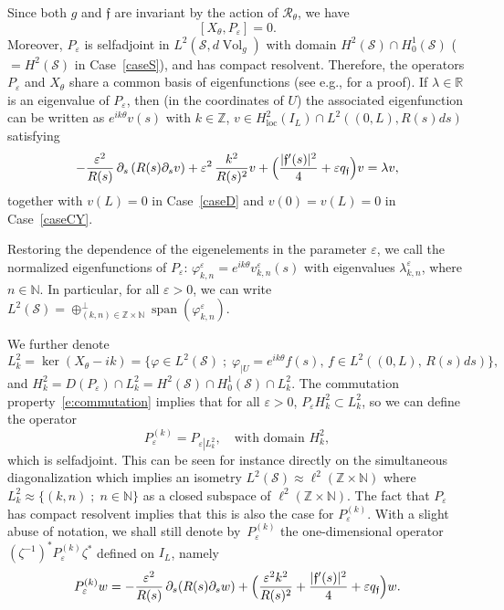 \documentclass[11pt]{article}
\newcommand{\eg}{e.g.,\xspace}
\numberwithin{equation}{section}
\newcommand{\sep}{\;;\;}
\theoremstyle{definition}
\newcommand{\calR}{\ensuremath{\mathcal R}}
\newcommand{\calS}{\ensuremath{\mathcal S}}
\newcommand{\mb}[1]{\ensuremath{\mathbb{#1}}}
\newcommand{\N}{{\mb{N}}}
\newcommand{\R}{{\mb{R}}}
\newcommand{\Z}{\mathbb Z}
\newcommand{\f}{\ensuremath{\mathfrak{f}}}
\DeclareMathOperator{\Vol}{Vol}
\DeclareMathOperator{\vect}{span}
\newcommand{\loc}{\mathrm{loc}}
\let\d\partial
\let\eps\varepsilon
\newcommand{\qf}{q_{\f}}
\begin{document}
Since both $g$ and $\f$ are invariant by the action of $\calR_\theta$, we have
\begin{equation}
\label{e:commutation}
[X_{\theta}, P_\eps ] =0.
\end{equation}
Moreover, $P_\eps$ is selfadjoint in $L^2(\calS, d\Vol_g)$ with domain $H^2(\calS) \cap H^1_0(\calS)$ ($=H^2(\calS)$ in Case~\ref{caseS}), and has compact resolvent. Therefore, the operators $P_\eps$ and $X_\theta$ share a common basis of eigenfunctions (see \eg \cite[\S 3.2]{LL:18} for a proof).
If $\lambda \in\R$ is an eigenvalue of $P_\eps$, then (in the coordinates of $U$) the associated eigenfunction can be written as $e^{ik \theta}v(s)$ with $k\in \Z$, $v \in H^2_{\loc}(I_L)\cap L^2\left((0,L), R(s)ds\right)$ satisfying
\begin{equation}
\label{equationk1D}
- \frac{\eps^2 }{R(s)}\, \d_s\left( R(s) \d_s v \right) + \eps^2\,\frac{k^2}{R(s)^2} v+ \Bigl( \frac{|\f'(s)|^2}{4} + \eps \qf\Bigr) v =\lambda v,
\end{equation}
together with $v(L)=0$ in Case~\ref{caseD} and $v(0)=v(L)=0$ in Case~\ref{caseCY}.

Restoring the dependence of the eigenelements in the parameter $\eps$, we call the normalized eigenfunctions of $P_\eps$: $\varphi_{k,n}^\eps=e^{ik \theta} v_{k,n}^\eps(s)$ with eigenvalues $\lambda_{k,n}^\eps$, where \hbox{$n\in \N$}. In particular, for all $\eps>0$, we can write $L^2(\calS)= \oplus^{\perp }_{(k,n)\in \Z\times \N}\vect (\varphi_{k,n}^\eps) $.

We further denote
\[
L^2_k=\ker (X_{\theta}-ik)=\bigl\{\varphi\in L^2(\calS)\sep\varphi_{|U} =e^{ik \theta}f(s),\,f \in L^2\left((0,L),\,R(s)ds\right)\bigr\},
\]
and $H^2_k=D(P_\eps) \cap L^2_k = H^2(\calS)\cap H^1_0(\calS)\cap L^2_k$. The commutation property~\eqref{e:commutation} implies that for all $\eps>0$, $P_\eps H^2_k\subset L^2_k$, so we can define the operator
\begin{equation}
\label{defPk}P_{\eps}^{(k)} =P_{\eps\left|L^2_k\right.}, \quad \text{with domain } H^2_k,
\end{equation}
which is selfadjoint. This can be seen for instance directly on the simultaneous diagonalization which implies an isometry $L^2(\calS) \approx \ell^2(\Z\times \N)$ where $L^2_k\approx\{(k,n)\sep n\in \N\}$ as a closed subspace of $\ell^2(\Z\times \N)$. The fact that $P_{\eps}$ has compact resolvent implies that this is also the case for $P_{\eps}^{(k)}$.
With a slight abuse of notation, we shall still denote by~$P_{\eps}^{(k)}$ the one-dimensional operator $(\zeta^{-1})^*P_{\eps}^{(k)} \zeta^*$ defined on $I_L$, namely
\begin{equation}
\label{equationk1D-bis}
P_{\eps}^{(k)} w = - \frac{\eps^2 }{R(s)}\, \d_s( R(s) \d_s w) + \Bigl(\frac{ \eps^2 k^2}{R(s)^2} + \frac{|\f'(s)|^2}{4} + \eps \qf\Bigr) w.
\end{equation}
\end{document}
